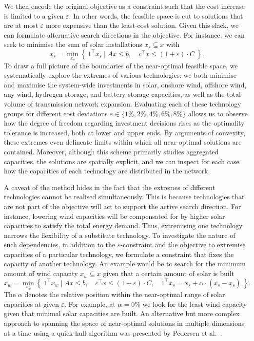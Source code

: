 
We then encode the original objective as a constraint 
such that the cost increase is limited to a given $\varepsilon$.
In other words, the feasible space is cut to solutions that
are at most $\varepsilon$ more expensive than the least-cost solution.
Given this slack, we can formulate alternative search directions in the objective.
For instance, we can seek to minimise the sum of solar installations $x_s \subseteq x$ with
\begin{equation}
    \overline{x_s} = \min_{x_s}\left\{\: 1^\top x_s \mid Ax\leq b,\quad c^\top x\leq (1+\varepsilon)\cdot C \:\right\}.
\end{equation}
To draw a full picture of the boundaries of the near-optimal feasible space, 
we systematically explore the extremes of various technologies:
we both minimise and maximise the system-wide investments in
solar, onshore wind, offshore wind, any wind, hydrogen storage, and battery storage
capacities, as well as the total volume of transmission network expansion.
Evaluating each of these technology groups for
different cost deviations $\varepsilon \in \{1\%,2\%,4\%,6\%,8\%\}$
allows us to observe how the degree of freedom regarding investment decisions
rises as the optimality tolerance is increased, both at lower and upper ends.
By arguments of convexity, these extremes even delineate limits
within which all near-optimal solutions are contained.
Moreover, although this scheme primarily studies aggregated capacities,
the solutions are spatially explicit, and we can inspect for each case
how the capacities of each technology are distributed in the network.


A caveat of the method hides in the fact that the extremes
of different technologies cannot be realised simultaneously.
This is because technologies that are not part of the objective
will act to support the active search direction.
For instance, lowering wind capacities will be compensated for
by higher solar capacities to satisfy the total energy demand.
Thus, extremising one technology narrows the flexibility of a substitute technology.
To investigate the nature of such dependencies,
in addition to the $\varepsilon$-constraint and the objective to
extremise capacities of a particular technology,
we formulate a constraint that fixes the capacity of another technology.
An example would be to search for the minimum amount of wind capacity $x_w \subseteq x$ 
given that a certain amount of solar is built
\begin{equation}
    \overline{x_w} = \min_{x_w}\left\{\:1^\top x_w \mid Ax\leq b,\quad c^\top x\leq (1+\varepsilon)\cdot C, \quad 1^\top x_s = \underline{x_s} + \alpha \cdot (\overline{x_s}-\underline{x_s}) \:\right\}.
\end{equation}
The $\alpha$ denotes the relative position within the near-optimal
range of solar capacities at given $\varepsilon$.
For example, at $\alpha=0\%$ we look for the least wind capacity
given that minimal solar capacities are built. 
An alternative but more complex approach to spanning the space of near-optimal solutions in multiple dimensions at a time
using a quick hull algorithm was presented by Pedersen et al.~\cite{pedersen_modeling_2020}.

